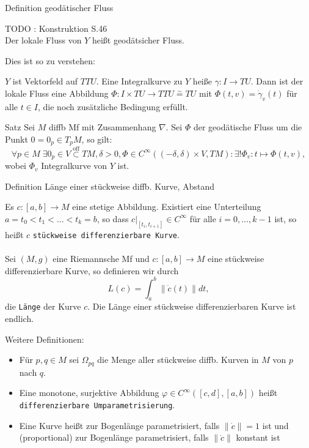 \documentclass[a6paper,11pt,grid=front]{kartei}
\newcommand{\fl}[1]{\begin{flushleft}
 #1 \end{flushleft}}
\newcounter{def}
\begin{document}
\nonameyet
{Definition} {geodätischer Fluss}
{
TODO : Konstruktion S.46 
%
\\
Der lokale Fluss von $Y$ heißt geodätsicher Fluss.
\scriptsize 
\fl{Dies ist so zu verstehen:}
$Y$ ist Vektorfeld auf $TTU$. Eine Integralkurve zu $Y$ heiße
$\gamma : I \to TU$. Dann ist der lokale Fluss eine Abbildung
$\Phi: I \times TU \to TTU \overset{\sim}{=} TU$ mit 
$ \Phi(t,v) = \dot\gamma_v(t)$ für alle $t\in I$, die noch zusätzliche 
Bedingung erfüllt.
}
{}

\nonameyet
{Satz} {}
{
Sei $M$ diffb Mf mit Zusammenhang $\nabla$. Sei $\Phi$ der geodätische
Fluss um die Punkt $0 = 0_p \in T_p M$, so gilt:
\scriptsize
\[
\forall p\in M \; \exists 0_p \in V \overset{\text{off}}{\subset} TM,
\delta > 0, \Phi\in C^\infty((-\delta,\delta)\times V,TM)
: \exists! \Phi_v : t\mapsto \Phi(t,v), 
\]
wobei $\Phi_v$ Integralkurve von $Y$ ist.
}
{}

\nonameyet
{\tiny Definition} {\tiny Länge einer stückweise diffb. Kurve, Abstand}
{
\scriptsize
Es $c: [a,b] \to M$ eine stetige Abbildung. 
Existiert eine Unterteilung $a = t_0 < t_1 < \dots < t_k = b$, so dass
$c|_{[t_i,t_{i+1}]} \in C^\infty$ für alle $i = 0,\dots, k-1$ ist,
so heißt $c$ \texttt{stückweise differenzierbare Kurve}.
\\
~\\
Sei $(M,g)$ eine Riemannsche Mf und $c : [a,b] \to M$ eine stückweise
differenzierbare Kurve, so definieren wir durch
\[
L(c) = \int_a^b \| \dot c(t) \| dt,
\]
die \texttt{Länge} der Kurve $c$. 
Die Länge einer stückweise differenzierbaren Kurve ist endlich.
\fl{Weitere Definitionen:}
\begin{itemize}[-]
\item Für $p,q \in M$ sei $\Omega_{pq}$ die Menge aller stückweise
			diffb. Kurven in $M$ von $p$ nach $q$.  
\item %
Eine monotone, surjektive Abbildung $\varphi \in C^\infty([c,d],[a,b])$ heißt
		\texttt{differenzierbare Umparametrisierung}.
\item %
Eine Kurve heißt zur Bogenlänge parametrisiert, falls
$\| \dot c \|  = 1$ ist und (proportional) zur Bogenlänge parametrisiert,
falls $\| \dot c \|$ konstant ist
\end{itemize}
}
{}
\end{document}
